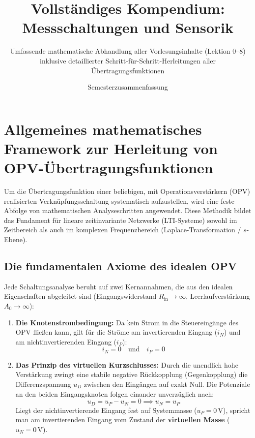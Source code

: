 \documentclass[11pt,a4paper]{article}
\title{\textbf{Vollständiges Kompendium: Messschaltungen und Sensorik}}
\author{Umfassende mathematische Abhandlung aller Vorlesungsinhalte (Lektion 0--8) \\ inklusive detaillierter Schritt-für-Schritt-Herleitungen aller Übertragungsfunktionen}
\date{Semesterzusammenfassung}
\begin{document}
\maketitle
\tableofcontents
\newpage

\section{Allgemeines mathematisches Framework zur Herleitung von OPV-Übertragungsfunktionen}

Um die Übertragungsfunktion einer beliebigen, mit Operationsverstärkern (OPV) realisierten Verknüpfungsschaltung systematisch aufzustellen, wird eine feste Abfolge von mathematischen Analyseschritten angewendet. Diese Methodik bildet das Fundament für lineare zeitinvariante Netzwerke (LTI-Systeme) sowohl im Zeitbereich als auch im komplexen Frequenzbereich (Laplace-Transformation / $s$-Ebene).

\subsection{Die fundamentalen Axiome des idealen OPV}
Jede Schaltungsanalyse beruht auf zwei Kernannahmen, die aus den idealen Eigenschaften abgeleitet sind (Eingangswiderstand $R_{\text{in}} \to \infty$, Leerlaufverstärkung $A_0 \to \infty$):
\begin{enumerate}
    \item \textbf{Die Knotenstrombedingung:} Da kein Strom in die Steuereingänge des OPV fließen kann, gilt für die Ströme am invertierenden Eingang ($i_N$) und am nichtinvertierenden Eingang ($i_P$):
    \begin{equation}
    i_N = 0 \quad \text{und} \quad i_P = 0
    \end{equation}
    \item \textbf{Das Prinzip des virtuellen Kurzschlusses:} Durch die unendlich hohe Verstärkung zwingt eine stabile negative Rückkopplung (Gegenkopplung) die Differenzspannung $u_D$ zwischen den Eingängen auf exakt Null. Die Potenziale an den beiden Eingangsknoten folgen einander unverzüglich nach:
    \begin{equation}
    u_D = u_P - u_N = 0 \implies u_N = u_P
    \end{equation}
    Liegt der nichtinvertierende Eingang fest auf Systemmasse ($u_P = 0\,\text{V}$), spricht man am invertierenden Eingang vom Zustand der \textbf{virtuellen Masse} ($u_N = 0\,\text{V}$).
\end{enumerate}
\end{document}
